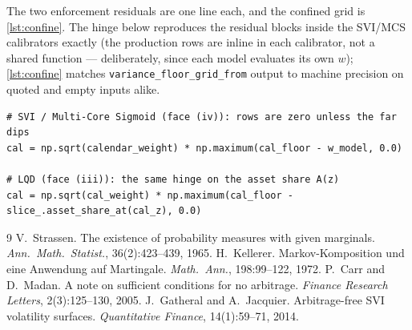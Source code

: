 \documentclass[11pt]{article}
\begin{document}
The two enforcement residuals are one line each, and the confined grid is
\cref{lst:confine}. The hinge below reproduces the residual blocks inside
the SVI/MCS calibrators exactly (the production rows are inline in each
calibrator, not a shared function --- deliberately, since each model
evaluates its own $w$); \cref{lst:confine} matches
\texttt{variance\_floor\_grid\_from} output to machine precision on quoted
and empty inputs alike.

\begin{lstlisting}[caption={The calendar hinge as it appears (inline) in
each parametric calibrator, and the LQD asset-share form.}]
# SVI / Multi-Core Sigmoid (face (iv)): rows are zero unless the far dips
cal = np.sqrt(calendar_weight) * np.maximum(cal_floor - w_model, 0.0)

# LQD (face (iii)): the same hinge on the asset share A(z)
cal = np.sqrt(cal_weight) * np.maximum(cal_floor - slice_.asset_share_at(cal_z), 0.0)
\end{lstlisting}

\begin{thebibliography}{9}
 V.~Strassen. The existence of probability measures
with given marginals. \emph{Ann.\ Math.\ Statist.}, 36(2):423--439, 1965.
 H.~Kellerer. Markov-Komposition und eine Anwendung
auf Martingale. \emph{Math.\ Ann.}, 198:99--122, 1972.
 P.~Carr and D.~Madan. A note on sufficient
conditions for no arbitrage. \emph{Finance Research Letters},
2(3):125--130, 2005.
 J.~Gatheral and A.~Jacquier. Arbitrage-free
SVI volatility surfaces. \emph{Quantitative Finance}, 14(1):59--71, 2014.
\end{thebibliography}
\end{document}
